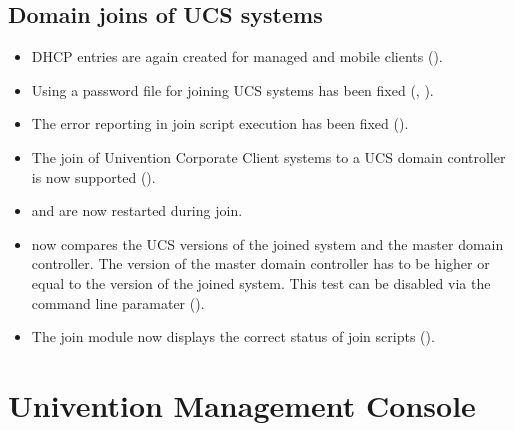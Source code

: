\subsection{Domain joins of UCS systems}
\begin{itemize}
\item DHCP entries are again created for managed and mobile clients ().
\item Using a password file for joining UCS systems has been fixed
  (, ).
\item The error reporting in join script execution has been fixed
  ().
\item The join of Univention Corporate Client systems to a UCS domain
  controller is now supported ().
\item {} and
   are now restarted
  during join.
\item {} now compares the UCS versions of the
  joined system and the master domain controller. The version of the
  master domain controller has to be higher or equal to the version of
  the joined system. This test can be disabled via the command line
  paramater  ().
\item The \ucsUMC{} join module now displays the correct status of join scripts
  ().
\end{itemize}



\section{Univention Management Console}

